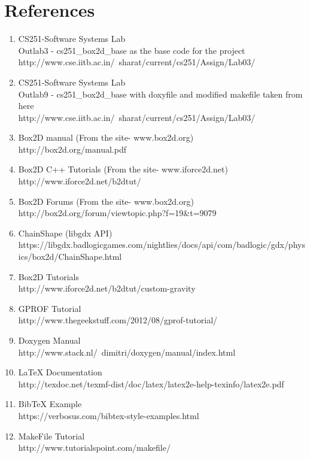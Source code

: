 \documentclass{report}
\begin{document}
\section{References}
\begin{enumerate}
 \item CS251-Software Systems Lab\\
    Outlab3 - cs251\_box2d\_base as the base code for the project\\
    http://www.cse.iitb.ac.in/~sharat/current/cs251/Assign/Lab03/
 \item CS251-Software Systems Lab\\
    Outlab9 - cs251\_box2d\_base with doxyfile and modified makefile taken from here\\
    http://www.cse.iitb.ac.in/~sharat/current/cs251/Assign/Lab03/
 \item Box2D manual (From the site- www.box2d.org)\\
    http://box2d.org/manual.pdf
 \item Box2D C++ Tutorials (From the site- www.iforce2d.net)\\
    http://www.iforce2d.net/b2dtut/
 \item Box2D Forums (From the site- www.box2d.org) \\
    http://box2d.org/forum/viewtopic.php?f=19\&t=9079
 \item ChainShape (libgdx API) \\
    https://libgdx.badlogicgames.com/nightlies/docs/api/com/badlogic/gdx/physics/box2d/ChainShape.html
 \item Box2D Tutorials\\
    http://www.iforce2d.net/b2dtut/custom-gravity
 \item GPROF Tutorial\\
    http://www.thegeekstuff.com/2012/08/gprof-tutorial/
 \item Doxygen Manual\\
    http://www.stack.nl/~dimitri/doxygen/manual/index.html
 \item LaTeX Documentation\\
     http://texdoc.net/texmf-dist/doc/latex/latex2e-help-texinfo/latex2e.pdf
 \item BibTeX Example\\
     https://verbosus.com/bibtex-style-examples.html
 \item MakeFile Tutorial\\
     http://www.tutorialspoint.com/makefile/
\end{enumerate}
\end{document}

